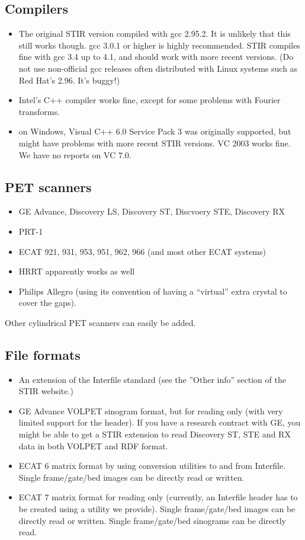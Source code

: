 \documentclass{article}
\begin{document}
\subsection{
Compilers}
\begin{itemize}
\item 
The original STIR version compiled with gcc 2.95.2. It is unlikely that this still works
though. gcc 3.0.1 or higher is highly recommended. STIR compiles fine with gcc 3.4 up to 4.1,
and should work with more recent versions.
(Do not use non-official gcc releases often distributed with 
Linux systems such as Red Hat's 2.96. It's buggy!)
\item Intel's C++ compiler works fine, except for some problems with Fourier transforms.
\item 
on Windows, Visual C++ 6.0 Service Pack 3 was originally supported, but might have problems
with more recent STIR versions. VC 2003 works fine. We have 
no reports on VC 7.0. 

\end{itemize}


\subsection{
PET scanners}
\begin{itemize}
\item 
GE Advance, Discovery LS, Discovery ST, Discvoery STE, Discovery RX 
\item 
PRT-1 
\item 
ECAT 921, 931, 953, 951, 962, 966 (and most other ECAT systems) 
\item 
HRRT apparently works as well
\item Philips Allegro (using its convention of having a ``virtual'' extra crystal to cover the gaps).
\end{itemize}

Other cylindrical PET scanners can easily be added.



\subsection{
File formats}
\begin{itemize}
\item 
An extension of the Interfile standard (see the ''Other info'' section of the STIR website.)
\item 
GE Advance VOLPET sinogram format, but for reading only (with 
very limited support for the header). If you have a research contract with GE,
you might be able to get a STIR extension to read Discovery ST, STE and RX data in both 
VOLPET and RDF format.
\item 
ECAT 6 matrix format by using conversion utilities to and from 
Interfile. Single frame/gate/bed images can be directly read 
or written.
\item 
ECAT 7 matrix format for reading only (currently, an Interfile 
header has to be created using a utility we provide). Single 
frame/gate/bed images can be directly read or written. Single 
frame/gate/bed sinograms can be directly read.
\end{itemize}
\end{document}
